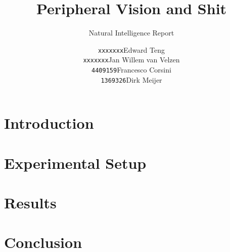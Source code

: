 \documentclass[a4,11pt]{scrartcl}
\title{Peripheral Vision and Shit}
\subtitle{Natural Intelligence Report}
\author{
\begin{tabular}{ll}
\texttt{xxxxxxx}&Edward Teng\\
\texttt{xxxxxxx}&Jan Willem van Velzen\\
\texttt{4409159}&Francesco Corsini\\
\texttt{1369326}&Dirk Meijer
\end{tabular}}
\begin{document}
    \maketitle{}
    \tableofcontents
    \section{Introduction}
    
    \section{Experimental Setup}
    
    \section{Results}
    
    \section{Conclusion}
    
    
\end{document}

